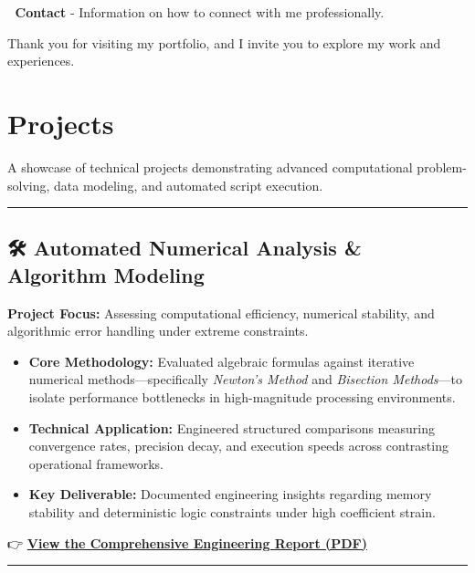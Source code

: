 \documentclass[
]{book}
\providecommand{\tightlist}{%
  \setlength{\itemsep}{0pt}\setlength{\parskip}{0pt}}
\begin{document}
📌 \textbf{Contact}
- Information on how to connect with me professionally.

Thank you for visiting my portfolio, and I invite you to explore my work and experiences.

\chapter{Projects}\label{projects}

A showcase of technical projects demonstrating advanced computational problem-solving, data modeling, and automated script execution.

\begin{center}\rule{0.5\linewidth}{0.5pt}\end{center}

\section*{🛠️ Automated Numerical Analysis \& Algorithm Modeling}\label{automated-numerical-analysis-algorithm-modeling}

\textbf{Project Focus:} Assessing computational efficiency, numerical stability, and algorithmic error handling under extreme constraints.

\begin{itemize}
\tightlist
\item
  \textbf{Core Methodology:} Evaluated algebraic formulas against iterative numerical methods---specifically \emph{Newton's Method} and \emph{Bisection Methods}---to isolate performance bottlenecks in high-magnitude processing environments.
\item
  \textbf{Technical Application:} Engineered structured comparisons measuring convergence rates, precision decay, and execution speeds across contrasting operational frameworks.
\item
  \textbf{Key Deliverable:} Documented engineering insights regarding memory stability and deterministic logic constraints under high coefficient strain.
\end{itemize}

👉 \href{assets/MAT_455_Report.pdf}{\textbf{View the Comprehensive Engineering Report (PDF)}}

\begin{center}\rule{0.5\linewidth}{0.5pt}\end{center}
\end{document}

